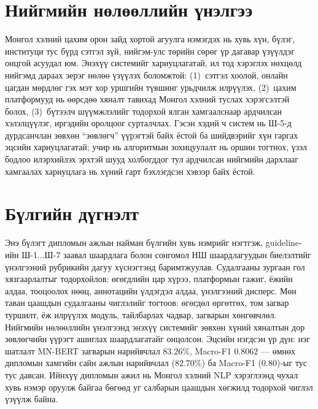 \section{Нийгмийн нөлөөллийн үнэлгээ}

Монгол хэлний цахим орон зайд хортой агуулга нэмэгдэх нь хувь хүн, бүлэг,
институци тус бүрд сэтгэл зүй, нийгэм-улс төрийн сөрөг үр дагавар үзүүлдэг
онцгой асуудал юм. Энэхүү системийг хариуцлагатай, ил тод хэрэглэх нөхцөлд
нийгэмд дараах эерэг нөлөө үзүүлэх боломжтой: (1)~сэтгэл хоолой, онлайн
цагдан мөрдлөг гэх мэт хор уршгийн түвшинг урьдчилж илрүүлэх, (2)~цахим
платформууд нь өөрсдөө хяналт тавихад Монгол хэлний туслах хэрэгсэлтэй
болох, (3)~бүтээлч шүүмжлэлийг тодорхой ялган хамгаалснаар ардчилсан
хэлэлцүүлэг, иргэдийн оролцоог сурталчлах. Гэсэн хэдий ч систем нь Ш-5-д
дурдсанчлан зөвхөн ``зөвлөгч'' үүрэгтэй байх ёстой ба шийдвэрийг хүн
гаргах эцсийн хариуцлагатай; учир нь алгоритмын зохицуулалт нь оршин тогтнох,
үзэл бодлоо илэрхийлэх эрхтэй шууд холбогддог тул ардчилсан нийгмийн дархлааг
хамгаалах хариуцлага нь хүний гарт бэхлэгдсэн хэвээр байх ёстой.

\section{Бүлгийн дүгнэлт}

Энэ бүлэгт дипломын ажлын найман бүлгийн хувь нэмрийг нэгтгэж, guideline-ийн
Ш-1...Ш-7 заавал шаардлага болон сонгомол НШ шаардлагуудын биелэлтийг
үнэлгээний рубрикийн дагуу хүснэгтэнд баримтжуулав. Судалгааны зургаан гол хязгаарлалтыг тодорхойлов: өгөгдлийн цар хүрээ, платформын
гажиг, ёжийн алдаа, тооцоолох нөөц, аннотацийн үлдэгдэл алдаа, үнэлгээний дисперс. Мөн таван цаашдын судалгааны чиглэлийг тогтоов:
өгөгдөл өргөтгөх, том загвар туршилт, ёж илрүүлэх модуль, тайлбарлах чадвар,
загварын хөнгөвчлөл. Нийгмийн
нөлөөллийн үнэлгээнд энэхүү системийг зөвхөн хүний хяналтын дор зөвлөгчийн
үүрэгт ашиглах шаардлагатайг онцолсон. Эцсийн нэгдсэн үр дүн: нэг шатлалт MN-BERT
загварын нарийвчлал $\mathbf{83.26\%}$, Macro-F1 $\mathbf{0.8062}$ --- өмнөх
дипломын хамгийн сайн ажлын нарийвчлал ($82.70\%$) ба Macro-F1
($0.80$)-ыг тус тус давсан. Ийнхүү дипломын ажил нь Монгол хэлний
NLP хэрэглээнд чухал хувь нэмэр оруулж байгаа бөгөөд уг салбарын цаашдын
хөгжилд тодорхой чиглэл үзүүлж байна.

